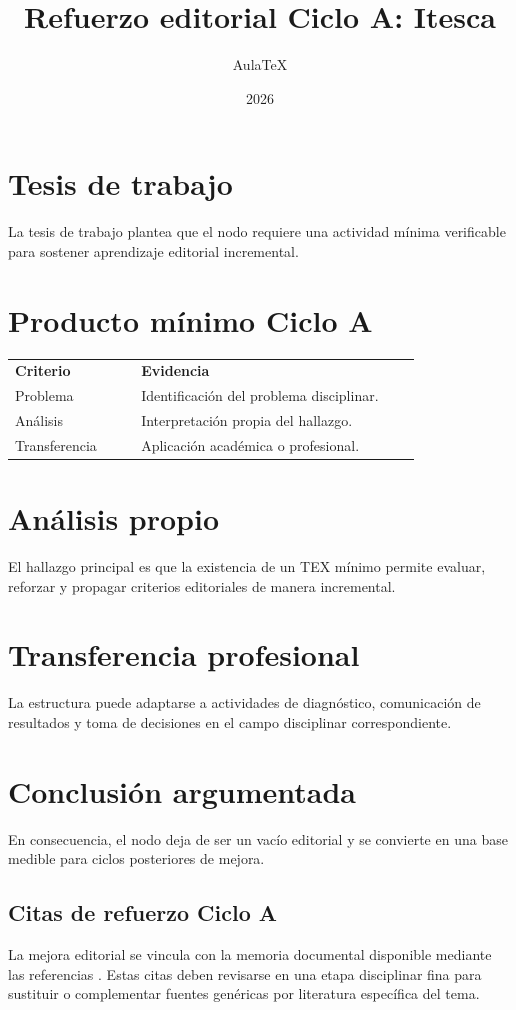 \documentclass[12pt]{article}
\title{Refuerzo editorial Ciclo A: Itesca}
\author{AulaTeX}
\date{2026}
\begin{document}
\maketitle
\section*{Tesis de trabajo}
La tesis de trabajo plantea que el nodo requiere una actividad mínima verificable para sostener aprendizaje editorial incremental.
\section*{Producto mínimo Ciclo A}
\begin{center}
\begin{tabular}{p{0.28\linewidth}p{0.62\linewidth}}
\textbf{Criterio} & \textbf{Evidencia}\\
Problema & Identificación del problema disciplinar.\\
Análisis & Interpretación propia del hallazgo.\\
Transferencia & Aplicación académica o profesional.\\
\end{tabular}
\end{center}
\section*{Análisis propio}
El hallazgo principal es que la existencia de un TEX mínimo permite evaluar, reforzar y propagar criterios editoriales de manera incremental.
\section*{Transferencia profesional}
La estructura puede adaptarse a actividades de diagnóstico, comunicación de resultados y toma de decisiones en el campo disciplinar correspondiente.
\section*{Conclusión argumentada}
En consecuencia, el nodo deja de ser un vacío editorial y se convierte en una base medible para ciclos posteriores de mejora.



\subsection*{Citas de refuerzo Ciclo A}
La mejora editorial se vincula con la memoria documental disponible mediante las referencias \citep{itescaSitioWeb,cicloARefuerzo02,cicloARefuerzo03,cicloARefuerzo04,cicloARefuerzo05,cicloARefuerzo06}. Estas citas deben revisarse en una etapa disciplinar fina para sustituir o complementar fuentes genéricas por literatura específica del tema.
\end{document}
